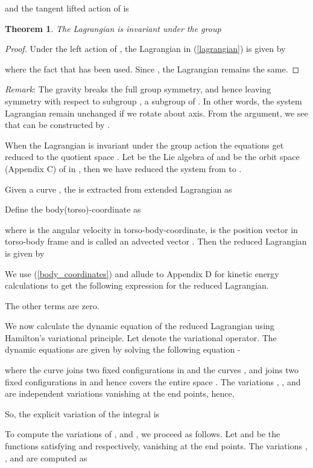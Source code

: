 \documentclass[letterpaper, 10 pt, conference]{ieeeconf}  \newcommand{\RN}[1]{\textup{\uppercase\expandafter{\romannumeral#1}}}
\newtheorem{theorem}{Theorem}
\begin{document}
and the tangent lifted action of  is

\begin{theorem}
The Lagrangian  is invariant under the group 

\end{theorem}
\begin{proof}
Under the left action of , the Lagrangian  in (\ref{lagrangian}) is given by


where the fact that  has been used. Since , the Lagrangian remains the same.
\end{proof}
\textit{Remark}: The gravity breaks the full group symmetry, and hence leaving symmetry with respect to subgroup , a subgroup of . In other words, the system Lagrangian remain unchanged if we rotate about  axis. From the argument, we see that  can be constructed by . 


When the Lagrangian  is invariant under the group action the equations get reduced to the quotient space . Let  be the Lie algebra of  and  be the orbit space (Appendix C)  of  in , then we have reduced the system from  to . 

Given a curve , the  is extracted from extended Lagrangian  as

Define the body(torso)-coordinate as

where  is the angular velocity in torso-body-coordinate,  is the position vector in torso-body frame and  is called an advected vector \cite{cendra}. Then the reduced Lagrangian  is given by

We use (\ref{body_coordinates}) and allude to Appendix D for kinetic energy calculations to get the following expression for the reduced Lagrangian.





The other terms are zero.

We now calculate the dynamic equation of the reduced Lagrangian  using Hamilton's variational principle. Let  denote the variational operator. The dynamic equations are given by solving the following equation -

where the curve  joins two fixed configurations in  and the curves ,  and  joins two fixed configurations in  and hence covers the entire space . The variations , ,  and  are independent variations vanishing at the end points, hence,
 
So, the explicit variation of the integral is

To compute the variations of ,  and , we proceed as follows. Let  and  be the functions satisfying  and  respectively, vanishing at the end points. The variations , ,  and  are computed as
\end{document}
